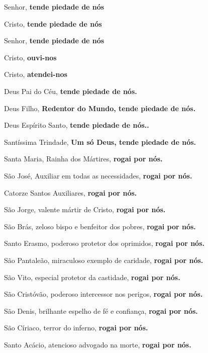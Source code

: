 \documentclass[a4paper,12pt]{extarticle} \usepackage[utf8]{inputenc}
\begin{document}
Senhor, \textbf{ tende piedade de nós}
                                      
Cristo, \textbf{ tende piedade de nós}
                                      
Senhor, \textbf{ tende piedade de nós}

 

Cristo, \textbf{ouvi-nos}

Cristo, \textbf{atendei-nos}

 

Deus Pai do Céu, \textbf{ tende piedade de nós.}

Deus Filho, \textbf{ Redentor do Mundo, tende piedade de nós.}

Deus Espírito Santo, \textbf{ tende piedade de nós..}

Santíssima Trindade, \textbf{ Um só Deus, tende piedade de nós.}

 

Santa Maria, Rainha dos Mártires, \textbf{rogai por nós.}

São José, Auxiliar em todas as necessidades, \textbf{rogai por nós.}

Catorze Santos Auxiliares, \textbf{rogai por nós.}

 

São Jorge, valente mártir de Cristo, \textbf{rogai por nós.}

 

São Brás, zeloso bispo e benfeitor dos pobres, \textbf{rogai por nós.}

 

Santo Erasmo, poderoso protetor dos oprimidos, \textbf{rogai por nós.}

 

São Pantaleão, miraculoso exemplo de caridade, \textbf{rogai por nós.}

 

São Vito, especial protetor da castidade, \textbf{rogai por nós.}

 

São Cristóvão, poderoso intercessor nos perigos, \textbf{rogai por nós.}

 

São Denis, brilhante espelho de fé e confiança, \textbf{rogai por nós.}

 

São Círiaco, terror do inferno, \textbf{rogai por nós.}

 

Santo Acácio, atencioso advogado na morte, \textbf{rogai por nós.}
\end{document}
